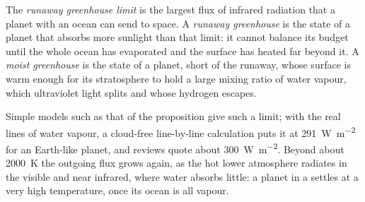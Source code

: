 \begin{definition}\label{def:b3:planetary-atmospheres:runaway}
The \emph{runaway greenhouse limit} is the
largest flux of infrared radiation that a planet with an ocean can send to
space. A \emph{runaway greenhouse} is the state
of a planet that absorbs more sunlight than that limit: it cannot balance
its budget until the whole ocean has evaporated and the surface has
heated far beyond it. A \emph{moist greenhouse}
is the state of a planet, short of the runaway, whose surface is warm
enough for its stratosphere to hold a large mixing ratio of water vapour,
which ultraviolet light splits and whose hydrogen escapes.
\end{definition}

Simple models such as that of the proposition give such a limit; with the
real lines of water vapour, a cloud-free line-by-line
calculation puts it at \qty{291}{W.m^{-2}} for an Earth-like planet, and
reviews quote about \qty{300}{W.m^{-2}}. Beyond about \qty{2000}{K} the
outgoing flux grows again, as the hot lower atmosphere radiates in the
visible and near infrared, where water absorbs little: a planet in a
 settles at a very high temperature, once its ocean is
all vapour.

